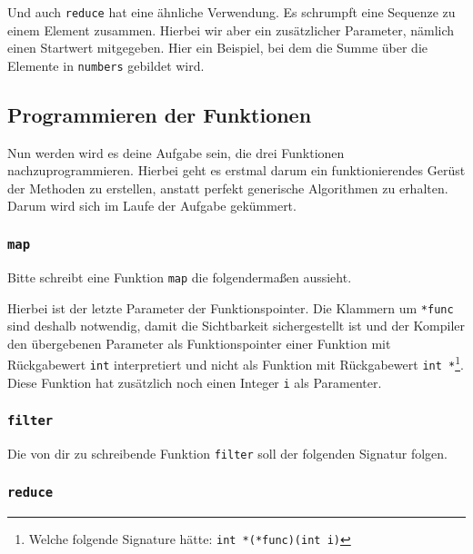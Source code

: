 

Und auch \lstinline{reduce} hat eine ähnliche Verwendung.
Es schrumpft eine Sequenze zu einem Element zusammen.
Hierbei wir aber ein zusätzlicher Parameter, nämlich einen Startwert mitgegeben.
Hier ein Beispiel, bei dem die Summe über die Elemente in \lstinline{numbers} gebildet wird.



\subsection{Programmieren der Funktionen}

Nun werden wird es deine Aufgabe sein, die drei Funktionen nachzuprogrammieren.
Hierbei geht es erstmal darum ein funktionierendes Gerüst der Methoden zu erstellen, anstatt perfekt generische Algorithmen zu erhalten.
Darum wird sich im Laufe der Aufgabe gekümmert.

\subsubsection{\lstinline{map}}

Bitte schreibt eine Funktion \lstinline{map} die folgendermaßen aussieht.



Hierbei ist der letzte Parameter der Funktionspointer.
Die Klammern um \lstinline{*func} sind deshalb notwendig, damit die Sichtbarkeit sichergestellt ist und der Kompiler den übergebenen Parameter als Funktionspointer einer Funktion mit Rückgabewert \lstinline{int} interpretiert und nicht als Funktion mit Rückgabewert \lstinline{int *}\footnote{Welche folgende Signature hätte: \lstinline{int *(*func)(int i)}}.
Diese Funktion hat zusätzlich noch einen Integer \lstinline{i} als Paramenter.

\subsubsection{\lstinline{filter}}

Die von dir zu schreibende Funktion \lstinline{filter} soll der folgenden Signatur folgen.



\subsubsection{\lstinline{reduce}}

